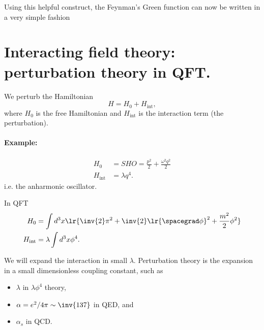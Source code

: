 Using this helpful construct, the Feynman's Green function can now be written in a very simple fashion

\section{Interacting field theory: perturbation theory in QFT.}

We perturb the Hamiltonian
\begin{equation}\label{eqn:qftLecture13:500}
H = H_0 + H_{\text{int}},
\end{equation}
where \( H_0 \) is the free Hamiltonian and \( H_{\text{int}} \) is the interaction term (the perturbation).

\paragraph{Example:}
\begin{equation}\label{eqn:qftLecture13:460}
\begin{aligned}
H_0 &= SHO = \frac{p^2}{2} + \frac{\omega^2 q^2}{2} \\
H_{\text{int}} &= \lambda q^4.
\end{aligned}
\end{equation}
i.e.  the anharmonic oscillator.

In QFT
\begin{equation}\label{eqn:qftLecture13:480}
\begin{aligned}
H_0 &=
\int d^3 x \lr{ \inv{2} \pi^2 + \inv{2} \lr{ \spacegrad \phi}^2 + \frac{m^2}{2} \phi^2 } \\
H_{\text{int}} &=
\lambda \int d^3 x \phi^4.
\end{aligned}
\end{equation}

We will expand the interaction in small \( \lambda \).  Perturbation theory is the expansion in a small dimensionless coupling constant, such as
\begin{itemize}
\item \( \lambda \) in \( \lambda \phi^4 \) theory,
\item \( \alpha = e^2/4 \pi \sim \inv{137} \) in QED, and
\item \( \alpha_s \) in QCD.
\end{itemize}

